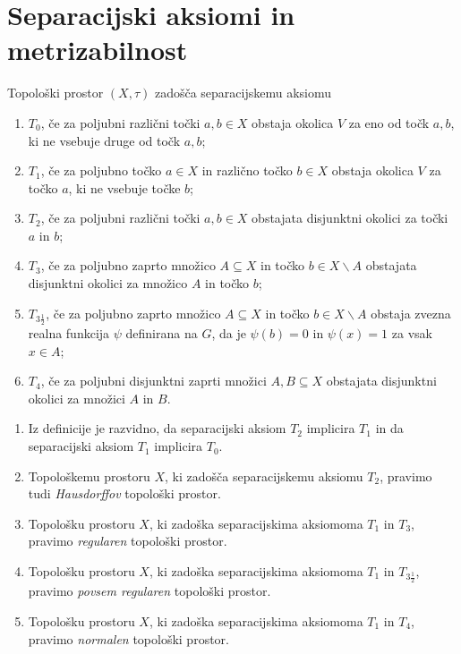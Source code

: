 \documentclass[mat1]{fmfdelo}
\begin{document}
\section{Separacijski aksiomi in metrizabilnost}

\begin{definicija}\label{def:sepaks}
	Topološki prostor $(X, \tau)$ zadošča separacijskemu aksiomu
	\begin{enumerate}
		\item $T_0$, če za poljubni različni točki $a, b \in X$ obstaja okolica $V$ za eno od točk $a, b$, ki ne vsebuje druge od točk $a, b$;
		\item $T_1$, če za poljubno točko $a \in X$ in različno točko $b \in X$ obstaja okolica $V$ za točko $a$, ki ne vsebuje točke $b$;
		\item $T_2$, če za poljubni različni točki $a, b \in X$ obstajata disjunktni okolici za točki $a$ in $b$;
		\item $T_3$, če za poljubno zaprto množico $A \subseteq X$ in točko $b \in X\backslash A$ obstajata disjunktni okolici za množico $A$ in točko $b$;
		\item $T_{3 \frac{1}{2}}$, če za poljubno zaprto množico $A \subseteq X$ in točko $b \in X\backslash A$ obstaja zvezna realna funkcija $\psi$ definirana na $G$, da je $\psi (b) = 0$ in $\psi (x) = 1$ za vsak $x \in A$;
		\item $T_4$, če za poljubni disjunktni zaprti množici $A, B \subseteq X$ obstajata disjunktni okolici za množici $A$ in $B$.
	\end{enumerate}
\end{definicija}

\begin{opomba}
	\begin{enumerate}
		\item Iz definicije je razvidno, da separacijski aksiom $T_2$ implicira $T_1$ in da separacijski aksiom $T_1$ implicira $T_0$.
		\item Topološkemu prostoru $X$, ki zadošča separacijskemu aksiomu $T_2$, pravimo tudi \emph{Hausdorffov} topološki prostor.
		\item Topološku prostoru $X$, ki zadoška separacijskima aksiomoma $T_1$ in $T_3$, pravimo \emph{regularen} topološki prostor.
		\item Topološku prostoru $X$, ki zadoška separacijskima aksiomoma $T_1$ in $T_{3 \frac{1}{2}}$, pravimo \emph{povsem regularen} topološki prostor.
		\item Topološku prostoru $X$, ki zadoška separacijskima aksiomoma $T_1$ in $T_4$, pravimo \emph{normalen} topološki prostor.
	\end{enumerate}
\end{opomba}
\end{document}
